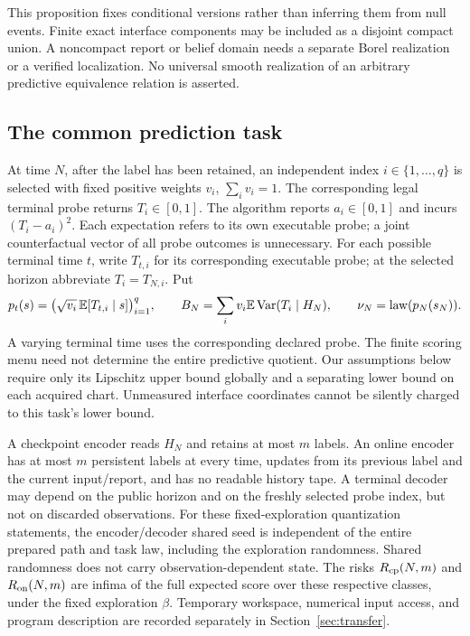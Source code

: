 This proposition fixes conditional versions rather than inferring them from null events. Finite exact interface components may be included as a disjoint compact union. A noncompact report or belief domain needs a separate Borel realization or a verified localization. No universal smooth realization of an arbitrary predictive equivalence relation is asserted.

\subsection{The common prediction task}
At time $N$, after the label has been retained, an independent index $i\in\{1,\ldots,q\}$ is selected with fixed positive weights $v_i$, $\sum_i v_i=1$. The corresponding legal terminal probe returns $T_i\in[0,1]$. The algorithm reports $a_i\in[0,1]$ and incurs $(T_i-a_i)^2$. Each expectation refers to its own executable probe; a joint counterfactual vector of all probe outcomes is unnecessary. For each possible terminal time $t$, write $T_{t,i}$ for its corresponding executable probe; at the selected horizon abbreviate $T_i=T_{N,i}$. Put
\begin{equation}\label{eq:score}
 p_t(s)=\big(\sqrt{v_i}\,\mathbb E[T_{t,i}\mid s]\big)_{i=1}^q,
 \qquad B_N=\sum_i v_i\mathbb E\operatorname{Var}(T_i\mid H_N),
 \qquad \nu_N=\operatorname{law}(p_N(s_N)).
\end{equation}
A varying terminal time uses the corresponding declared probe. The finite scoring menu need not determine the entire predictive quotient. Our assumptions below require only its Lipschitz upper bound globally and a separating lower bound on each acquired chart. Unmeasured interface coordinates cannot be silently charged to this task's lower bound.

A checkpoint encoder reads $H_N$ and retains at most $m$ labels. An online encoder has at most $m$ persistent labels at every time, updates from its previous label and the current input/report, and has no readable history tape. A terminal decoder may depend on the public horizon and on the freshly selected probe index, but not on discarded observations. For these fixed-exploration quantization statements, the encoder/decoder shared seed is independent of the entire prepared path and task law, including the exploration randomness. Shared randomness does not carry observation-dependent state. The risks $R_{\mathrm{cp}}(N,m)$ and $R_{\mathrm{on}}(N,m)$ are infima of the full expected score over these respective classes, under the fixed exploration $\beta$. Temporary workspace, numerical input access, and program description are recorded separately in Section~\ref{sec:transfer}.

